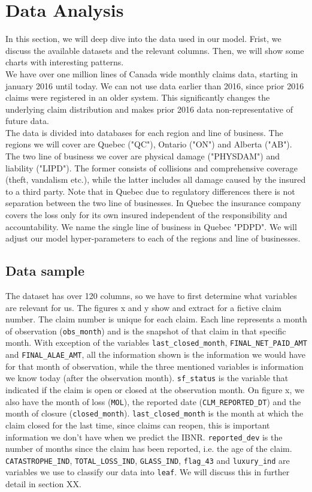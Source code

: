 \section{Data Analysis}\label{Section_dataAnalysis}
In this section, we will deep dive into the data used in our model. Frist, we discuss the available datasets and the relevant columns. Then, we will show some charts with interesting patterns.\\

We have over one million lines of Canada wide monthly claims data, starting in january 2016 until today. We can not use data earlier than 2016, since prior 2016 claims were registered in an older system. This significantly changes the underlying claim distribution and makes prior 2016 data non-representative of future data.\\
The data is divided into databases for each region and line of business. The regions we will cover are Quebec ("QC"), Ontario ("ON") and Alberta ("AB"). The two line of business we cover are physical damage ("PHYSDAM") and liability ("LIPD"). The former consists of collisions and comprehensive coverage (theft, vandalism etc.), while the latter includes all damage caused by the insured to a third party. Note that in Quebec due to regulatory differences there is not separation between the two line of businesses. In Quebec the insurance company covers the loss only for its own insured independent of the responsibility and accountability. We name the single line of business in Quebec "PDPD". We will adjust our model hyper-parameters to each of the regions and line of businesses. \\

	\subsection{Data sample}
	The dataset has over 120 columns, so we have to first determine what variables are relevant for us.  The figures x and y show and extract for a fictive claim number. The claim number is unique for each claim. Each line represents a month of observation (\texttt{obs\_month}) and is the snapshot of that claim in that specific month. With exception of the variables \texttt{last\_closed\_month}, \texttt{FINAL\_NET\_PAID\_AMT} and \texttt{FINAL\_ALAE\_AMT}, all the information shown is the information we would have for that month of observation, while the three mentioned variables is information we know today (after the observation month). \texttt{sf\_status} is the variable that indicated if the claim is open or closed at the observation month. On figure x, we also have the month of loss (\texttt{MOL}), the reported date (\texttt{CLM\_REPORTED\_DT}) and the month of closure (\texttt{closed\_month}). \texttt{last\_closed\_month} is the month at which the claim closed for the last time, since claims can reopen, this is important information we don’t have when we predict the IBNR.  \texttt{reported\_dev} is the number of months since the claim has been reported, i.e. the age of the claim. \texttt{CATASTROPHE\_IND}, \texttt{TOTAL\_LOSS\_IND}, \texttt{GLASS\_IND}, \texttt{flag\_43} and \texttt{luxury\_ind} are variables we use to classify our data into \texttt{leaf}. We will discuss this in further detail in section XX. 
	
